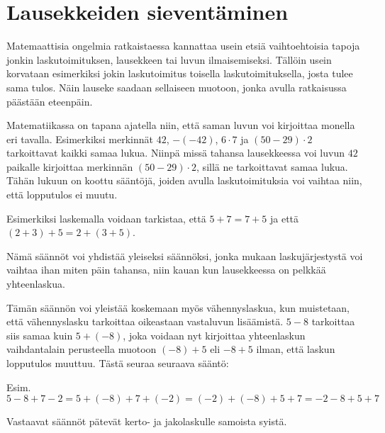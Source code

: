 \chapter{Lausekkeiden sieventäminen}

Matemaattisia ongelmia ratkaistaessa kannattaa usein etsiä vaihtoehtoisia tapoja jonkin laskutoimituksen, lausekkeen tai luvun ilmaisemiseksi. Tällöin usein korvataan esimerkiksi jokin laskutoimitus toisella laskutoimituksella, josta tulee sama tulos. Näin lauseke saadaan sellaiseen muotoon, jonka avulla ratkaisussa päästään eteenpäin.

Matematiikassa on tapana ajatella niin, että saman luvun voi kirjoittaa monella eri tavalla. Esimerkiksi merkinnät $42$, $-(-42)$, $6\cdot 7$ ja $(50-29)\cdot 2$ tarkoittavat kaikki samaa lukua. Niinpä missä tahansa lausekkeessa voi luvun $42$ paikalle kirjoittaa merkinnän $(50-29)\cdot 2$, sillä ne tarkoittavat samaa lukua. Tähän lukuun on koottu sääntöjä, joiden avulla laskutoimituksia voi vaihtaa niin, että lopputulos ei muutu.


Esimerkiksi laskemalla voidaan tarkistaa, että $5+7=7+5$ ja että $(2+3)+5=2+(3+5)$.

Nämä säännöt voi yhdistää yleiseksi säännöksi, jonka mukaan laskujärjestystä voi vaihtaa ihan miten päin tahansa, niin kauan kun lausekkeessa on pelkkää yhteenlaskua.

Tämän säännön voi yleistää koskemaan myös vähennyslaskua, kun muistetaan, että vähennyslasku tarkoittaa oikeastaan vastaluvun lisäämistä. $5-8$ tarkoittaa siis samaa kuin $5+(-8)$, joka voidaan nyt kirjoittaa yhteenlaskun vaihdantalain perusteella muotoon $(-8)+5$ eli $-8+5$ ilman, että laskun lopputulos muuttuu. Tästä seuraa seuraava sääntö:


Esim. $5-8+7-2=5+(-8)+7+(-2)=(-2)+(-8)+5+7=-2-8+5+7$

Vastaavat säännöt pätevät kerto- ja jakolaskulle samoista syistä.


